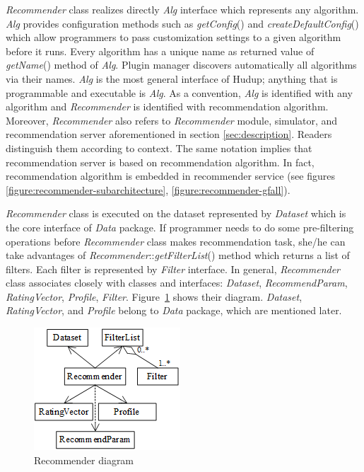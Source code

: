 \documentclass[a4paper,twoside]{article}
\begin{document}
\textit{Recommender} class realizes directly \textit{Alg} interface which represents any algorithm. \textit{Alg} provides configuration methods such as \textit{getConfig}() and \textit{createDefaultConfig}() which allow programmers to pass customization settings to a given algorithm before it runs. Every algorithm has a unique name as returned value of \textit{getName}() method of \textit{Alg}. Plugin manager discovers automatically all algorithms via their names. \textit{Alg} is the most general interface of Hudup; anything that is programmable and executable is \textit{Alg}. As a convention, \textit{Alg} is identified with any algorithm and \textit{Recommender} is identified with recommendation algorithm. Moreover, \textit{Recommender} also refers to \textit{Recommender} module, simulator, and recommendation server aforementioned in section \ref{sec:description}. Readers distinguish them according to context. The same notation implies that recommendation server is based on recommendation algorithm. In fact, recommendation algorithm is embedded in recommender service (see figures \ref{figure:recommender-subarchitecture}, \ref{figure:recommender-gfall}).

\textit{Recommender} class is executed on the dataset represented by \textit{Dataset} which is the core interface of \textit{Data} package. If programmer needs to do some pre-filtering operations before \textit{Recommender} class makes recommendation task, she/he can take advantages of \textit{Recommender}::\textit{getFilterList}() method which returns a list of filters. Each filter is represented by \textit{Filter} interface. In general, \textit{Recommender} class associates closely with classes and interfaces: \textit{Dataset}, \textit{RecommendParam}, \textit{RatingVector}, \textit{Profile}, \textit{Filter}. Figure~\ref{figure:recommender-diagram} shows their diagram. \textit{Dataset}, \textit{RatingVector}, and \textit{Profile} belong to \textit{Data} package, which are mentioned later.
\begin{figure}
\centering
\includegraphics{RecommenderDiagram.png}
\caption{Recommender diagram}
\label{figure:recommender-diagram}
\end{figure}
\end{document}
